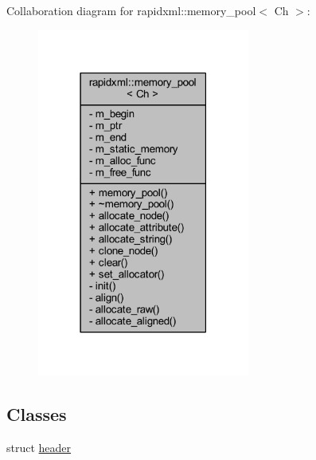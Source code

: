 Collaboration diagram for rapidxml\+:\+:memory\+\_\+pool$<$ Ch $>$\+:
\nopagebreak
\begin{figure}[H]
\begin{center}
\leavevmode
\includegraphics[width=198pt]{classrapidxml_1_1memory__pool__coll__graph}
\end{center}
\end{figure}
\subsection*{Classes}
\begin{DoxyCompactItemize}
\item 
struct \hyperlink{structrapidxml_1_1memory__pool_1_1header}{header}
\end{DoxyCompactItemize}
